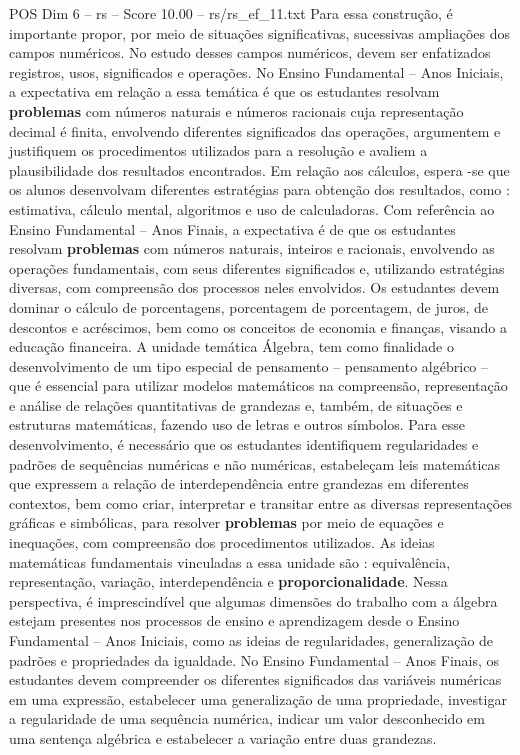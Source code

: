 \begin{textsample}{POS Dim 6 – rs – Score 10.00 – rs/rs\_ef\_11.txt}
Para essa construção, é importante propor, por meio de situações significativas, sucessivas ampliações dos campos numéricos.
No estudo desses campos numéricos, devem ser enfatizados registros, usos, significados e operações.
No Ensino Fundamental – Anos Iniciais, a expectativa em relação a essa temática é que os estudantes resolvam \textbf{problemas} com números naturais e números racionais cuja representação decimal é finita, envolvendo diferentes significados das operações, argumentem e justifiquem os procedimentos utilizados para a resolução e avaliem a plausibilidade dos resultados encontrados.
Em relação aos cálculos, espera -se que os alunos desenvolvam diferentes estratégias para obtenção dos resultados, como : estimativa, cálculo mental, algoritmos e uso de calculadoras.
Com referência ao Ensino Fundamental – Anos Finais, a expectativa é de que os estudantes resolvam \textbf{problemas} com números naturais, inteiros e racionais, envolvendo as operações fundamentais, com seus diferentes significados e, utilizando estratégias diversas, com compreensão dos processos neles envolvidos.
Os estudantes devem dominar o cálculo de porcentagens, porcentagem de porcentagem, de juros, de descontos e acréscimos, bem como os conceitos de economia e finanças, visando a educação financeira.
A unidade temática Álgebra, tem como finalidade o desenvolvimento de um tipo especial de pensamento – pensamento algébrico – que é essencial para utilizar modelos matemáticos na compreensão, representação e análise de relações quantitativas de grandezas e, também, de situações e estruturas matemáticas, fazendo uso de letras e outros símbolos.
Para esse desenvolvimento, é necessário que os estudantes identifiquem regularidades e padrões de sequências numéricas e não numéricas, estabeleçam leis matemáticas que expressem a relação de interdependência entre grandezas em diferentes contextos, bem como criar, interpretar e transitar entre as diversas representações gráficas e simbólicas, para resolver \textbf{problemas} por meio de equações e inequações, com compreensão dos procedimentos utilizados.
As ideias matemáticas fundamentais vinculadas a essa unidade são : equivalência, representação, variação, interdependência e \textbf{proporcionalidade}.
Nessa perspectiva, é imprescindível que algumas dimensões do trabalho com a álgebra estejam presentes nos processos de ensino e aprendizagem desde o Ensino Fundamental – Anos Iniciais, como as ideias de regularidades, generalização de padrões e propriedades da igualdade.
No Ensino Fundamental – Anos Finais, os estudantes devem compreender os diferentes significados das variáveis numéricas em uma expressão, estabelecer uma generalização de uma propriedade, investigar a regularidade de uma sequência numérica, indicar um valor desconhecido em uma sentença algébrica e estabelecer a variação entre duas grandezas.

\end{textsample}

